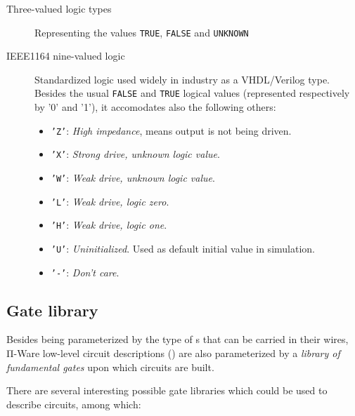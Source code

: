            \begin{description}
                \item[Three-valued logic types]
                    Representing the values \texttt{TRUE}, \texttt{FALSE} and \texttt{UNKNOWN}
                \item[IEEE1164 nine-valued logic]
                    Standardized logic used widely in industry as a VHDL/Verilog type.
                    Besides the usual \texttt{FALSE} and \texttt{TRUE} logical values
                    (represented respectively by '0' and '1'),
                    it accomodates also the following others:
                    \begin{itemize}
                        \item \texttt{'Z'}: \emph{High impedance}, means output is not being driven.
                        \item \texttt{'X'}: \emph{Strong drive, unknown logic value}.
                        \item \texttt{'W'}: \emph{Weak drive, unknown logic value}.
                        \item \texttt{'L'}: \emph{Weak drive, logic zero}.
                        \item \texttt{'H'}: \emph{Weak drive, logic one}.
                        \item \texttt{'U'}: \emph{Uninitialized}. Used as default initial value in simulation.
                        \item \texttt{'-'}: \emph{Don't care}.
                    \end{itemize}
            \end{description}



        \subsection{Gate library}
        \label{subsec:gate-library}
            Besides being parameterized by the type of s that can be carried in their wires,
            Π-Ware low-level circuit descriptions () are also parameterized by
            a \emph{library of fundamental gates} upon which circuits are built.

            There are several interesting possible gate libraries which could be used to describe circuits,
            among which:

